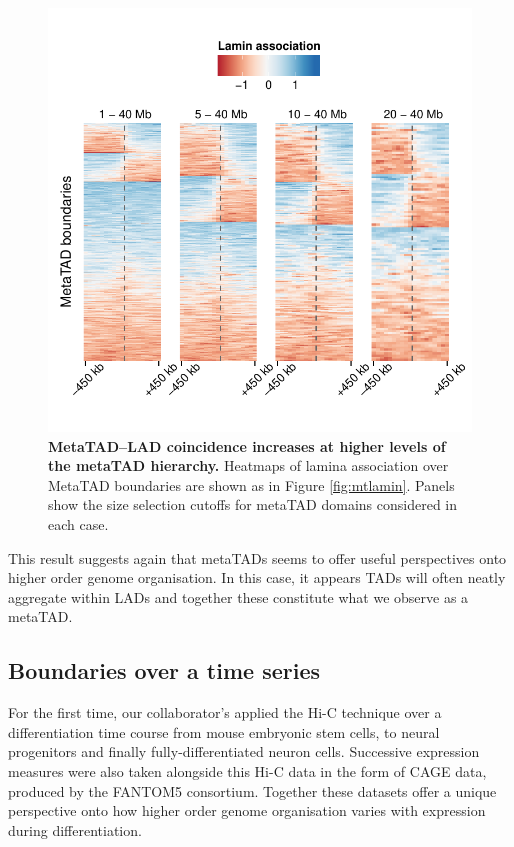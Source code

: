 \documentclass[a4paper,11pt,oneside]{book}
\begin{document}
\begin{figure}
\begin{center} 
\includegraphics[width=5in]{mt_cutoffrange.pdf}
\captionsetup{width=\textwidth}
\caption[ MetaTAD--LAD coincidence increases at higher levels of the metaTAD hierarchy. ]{ {\bf MetaTAD--LAD coincidence increases at higher levels of the metaTAD hierarchy. }
Heatmaps of lamina association over MetaTAD boundaries are shown as in Figure \ref{fig:mtlamin}. Panels show the size selection cutoffs for metaTAD domains considered in each case.
}\label{fig:mtcutoffrange}
\end{center}
\end{figure} 

This result suggests again that metaTADs seems to offer useful perspectives onto higher order genome organisation. In this case, it appears TADs will often neatly aggregate within LADs and together these constitute what we observe as a metaTAD.

\subsection{Boundaries over a time series}

For the first time, our collaborator's applied the Hi-C technique over a differentiation time course from mouse embryonic stem cells, to neural progenitors and finally fully-differentiated neuron cells. Successive expression measures were also taken alongside this Hi-C data in the form of CAGE data, produced by the FANTOM5 consortium.\cite{fantom5} Together these datasets offer a unique perspective onto how higher order genome organisation varies with expression during differentiation. 
\end{document}

